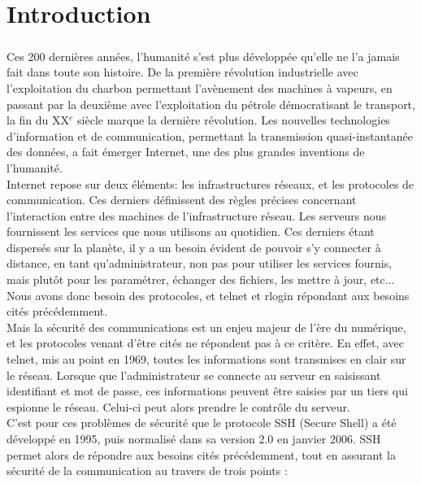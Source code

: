 \chapter{Introduction}
\paragraph{}
Ces 200 dernières années, l'humanité s'est plus développée qu'elle ne l'a jamais fait dans toute son histoire. De la première révolution industrielle avec l'exploitation du charbon permettant l'avènement des machines à vapeurs, en passant par la deuxième avec l'exploitation du pétrole démocratisant le transport, la fin du XX$^{e}$ siècle marque la dernière révolution\cite{jancovici_monde_2021}. Les nouvelles technologies d'information et de communication, permettant la transmission quasi-instantanée des données, a fait émerger Internet, une des plus grandes inventions de l'humanité.\\

Internet repose sur deux éléments: les infrastructures réseaux, et les protocoles de communication. Ces derniers définissent des règles précises concernant l'interaction entre des machines de l'infrastructure réseau. Les serveurs nous fournissent les services que nous utilisons au quotidien. Ces derniers étant dispersés sur la planète, il y a un besoin évident de pouvoir s'y connecter à distance, en tant qu'administrateur, non pas pour utiliser les services fournis, mais plutôt pour les paramétrer, échanger des fichiers, les mettre à jour, etc... Nous avons donc besoin des protocoles, et {\ttfamily telnet} et {\ttfamily rlogin} répondant aux besoins cités précédemment.\\

Mais la sécurité des communications est un enjeu majeur de l'ère du numérique, et les protocoles venant d'être cités ne répondent pas à ce critère. En effet, avec {\ttfamily telnet}, mis au point en 1969, toutes les informations sont transmises en clair sur le réseau. Lorsque que l'administrateur se connecte au serveur en saisissant identifiant et mot de passe, ces informations peuvent être saisies par un tiers qui espionne le réseau. Celui-ci peut alors prendre le contrôle du serveur. \cite{noauthor_attaques_nodate}\\

C'est pour ces problèmes de sécurité que le protocole SSH (Secure Shell) a été développé en 1995, puis normalisé dans sa version 2.0 en janvier 2006. SSH permet alors de répondre aux besoins cités précédemment, tout en assurant la sécurité de la communication au travers de trois points \cite{hajjeh_ibrahim_protocole_2006}:

